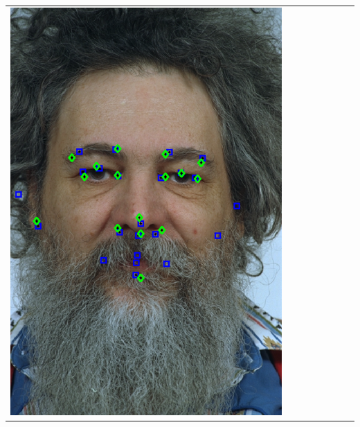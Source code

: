 \documentclass[portrait,final,a0paper,fontscale=0.277]{baposter}
\begin{document}
\begin{poster}
{{\begin{tabular}{@{}rccccccc@{}}
\parbox[c]{0.11\linewidth}{\includegraphics[width=\linewidth]{images/l_fa_success_2.pdf}} &

\end{tabular}}}
\end{poster}
\end{document}
